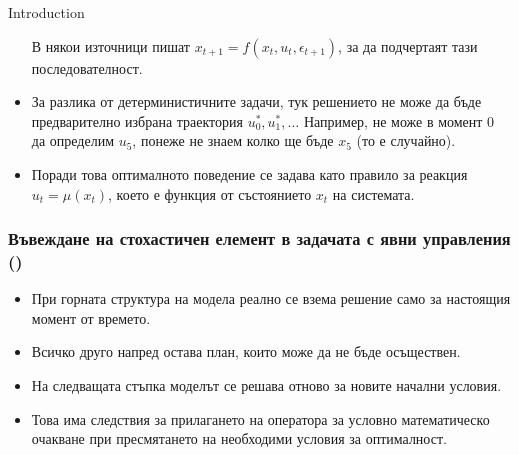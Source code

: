 \documentclass[10pt]{beamer}
\theoremstyle{definition}
\begin{document}
\begin{section}{Introduction}
\begin{frame}
\begin{itemize}
В някои източници пишат  $ x_{t+1}=f(x_t,u_t,\epsilon_{t+1}) $, за да подчертаят тази последователност.
\item За разлика от детерминистичните задачи, тук решението не може да бъде предварително избрана траектория $ u^*_0, u^*_1, \ldots $ Например, не може в момент 0 да определим $ u_5 $, понеже не знаем колко ще бъде $ x_5 $ (то е случайно).
\item Поради това оптималното поведение се задава като правило за реакция $ u_t=\mu(x_t) $, което е функция от състоянието $ x_t $ на системата. 
\end{itemize}
\end{frame}


\begin{frame}
\frametitle{Въвеждане на стохастичен елемент в задачата с явни управления ()}
\begin{itemize}
\item При горната структура на модела реално се взема решение само за настоящия момент от времето.
\item Всичко друго напред остава план, които може да не бъде осъществен.
\item На следващата стъпка моделът се решава отново за новите начални условия.
\item Това има следствия за прилагането на оператора за условно математическо очакване при пресмятането на необходими условия за оптималност.
\end{itemize}
\end{frame}
\end{section}
\end{document}
